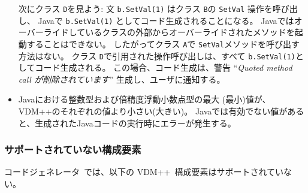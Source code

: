 \documentclass[\pformat,11pt]{jarticle}
\newcommand{\tcg}{コードジェネレータ}
\newcommand{\VDM}{VDM++}
\begin{document}
\begin{itemize}
次にクラス {\tt D}を見よう: 
文 {\tt b.SetVal(1)} はクラス {\tt B}の {\tt SetVal} 操作を呼び出し、
Javaで {\tt b.SetVal(1)} としてコード生成されることになる。
Javaではオーバーライドしているクラスの外部からオーバーライドされたメソッドを起動することはできない。
したがってクラス {\tt A}で {\tt SetVal}メソッドを呼び出す方法はない。
クラス {\tt D}で引用された操作呼び出しは、すべて {\tt b.SetVal(1)}としてコード生成される。 
この場合、コード生成は、警告 ``{\em Quoted method call が削除されています}'' 生成し、ユーザに通知する。

\item Javaにおける整数型および倍精度浮動小数点型の最大 (最小)値が、 \VDM{}のそれぞれの値より小さい(大きい)。
Javaでは有効でない値があると、生成されたJavaコードの実行時にエラーが発生する。
\end{itemize}

\subsubsection{サポートされていない構成要素}
\label{lim2}

 \tcg\ では、以下の \VDM\ 構成要素はサポートされていない。
\end{document}
